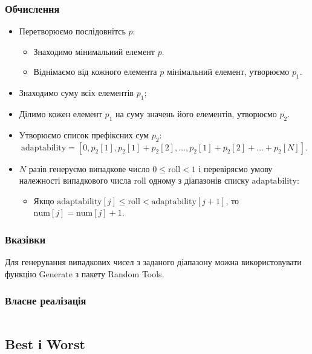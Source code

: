 \documentclass[a4paper, 12pt]{article}
\numberwithin{equation}{section}
\begin{document}
\subsubsection*{Обчислення}

\begin{itemize}
    \item Перетворюємо послідовнітсь $p$:
    \begin{itemize}
        \item Знаходимо мінимальний елемент $p$.
        \item Віднімаємо від кожного елемента $p$ мінімальний елемент, утворюємо $p_1$.
    \end{itemize}
    \item Знаходимо суму всіх елементів $p_1$;
    \item Ділимо кожен елемент $p_1$ на суму значень його елементів, утворюємо $p_2$.
    \item Утворюємо список префіксних сум $p_2$:
	\begin{equation}
	    \text{adaptability} = [0, p_2[1], p_2[1] + p_2[2], \ldots, p_2[1] + p_2[2] + \ldots + p_2[N]].
	\end{equation}
    \item $N$ разів генеруємо випадкове число $0 \le \text{roll} < 1$ і перевіряємо умову належності випадкового числа $\text{roll}$ одному з діапазонів списку $\text{adaptability}$:
    \begin{itemize}
        \item Якщо $\text{adaptability}[j] \le \text{roll} < \text{adaptability}[j + 1]$, то $\text{num}[j] = \text{num}[j] + 1$.
    \end{itemize}
\end{itemize}

\subsubsection*{Вказівки}

Для генерування випадкових чисел з заданого діапазону можна використовувати функцію Generate з пакету Random Tools.

\subsubsection*{Власне реалізація}

\inputminted[firstline=6, lastline=31]{python}{../code/adapt.py}

\subsection{Best і Worst}
\end{document}

